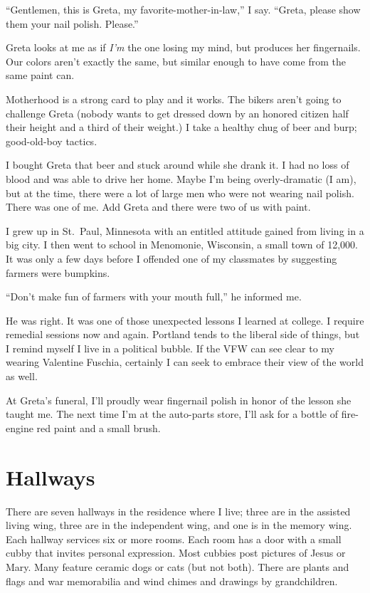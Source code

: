 \documentclass[
  letterpaper,
  DIV=11,
  numbers=noendperiod]{scrreprt}
\begin{document}
``Gentlemen, this is Greta, my favorite-mother-in-law,'' I say. ``Greta,
please show them your nail polish. Please.''

Greta looks at me as if \emph{I'm} the one losing my mind, but produces
her fingernails. Our colors aren't exactly the same, but similar enough
to have come from the same paint can.

Motherhood is a strong card to play and it works. The bikers aren't
going to challenge Greta (nobody wants to get dressed down by an honored
citizen half their height and a third of their weight.) I take a healthy
chug of beer and burp; good-old-boy tactics.

I bought Greta that beer and stuck around while she drank it. I had no
loss of blood and was able to drive her home. Maybe I'm being
overly-dramatic (I am), but at the time, there were a lot of large men
who were not wearing nail polish. There was one of me. Add Greta and
there were two of us with paint.

I grew up in St.~Paul, Minnesota with an entitled attitude gained from
living in a big city. I then went to school in Menomonie, Wisconsin, a
small town of 12,000. It was only a few days before I offended one of my
classmates by suggesting farmers were bumpkins.

``Don't make fun of farmers with your mouth full,'' he informed me.

He was right. It was one of those unexpected lessons I learned at
college. I require remedial sessions now and again. Portland tends to
the liberal side of things, but I remind myself I live in a political
bubble. If the VFW can see clear to my wearing Valentine Fuschia,
certainly I can seek to embrace their view of the world as well.

At Greta's funeral, I'll proudly wear fingernail polish in honor of the
lesson she taught me. The next time I'm at the auto-parts store, I'll
ask for a bottle of fire-engine red paint and a small brush.


\chapter*{Hallways}\label{hallways}


There are seven hallways in the residence where I live; three are in the
assisted living wing, three are in the independent wing, and one is in
the memory wing. Each hallway services six or more rooms. Each room has
a door with a small cubby that invites personal expression. Most cubbies
post pictures of Jesus or Mary. Many feature ceramic dogs or cats (but
not both). There are plants and flags and war memorabilia and wind
chimes and drawings by grandchildren.
\end{document}
